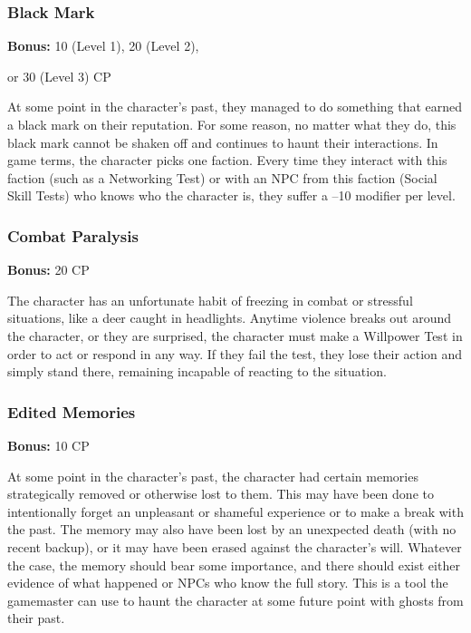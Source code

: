 \subsubsection{Black Mark}

\textbf{Bonus:} 10 (Level 1), 20 (Level 2), 

or 30 (Level 3) CP

At some point in the character's past, they managed 
to do something that earned a black mark on their 
reputation. For some reason, no matter what they do, 
this black mark cannot be shaken off and continues to 
haunt their interactions. In game terms, the character 
picks one faction. Every time they interact with this 
faction (such as a Networking Test) or with an NPC 
from this faction (Social Skill Tests) who knows who 
the character is, they suffer a –10 modifier per level.

\subsubsection{Combat Paralysis}

\textbf{Bonus:} 20 CP

The character has an unfortunate habit of freezing 
in combat or stressful situations, like a deer caught in 
headlights. Anytime violence breaks out around the 
character, or they are surprised, the character must 
make a Willpower Test in order to act or respond in 
any way. If they fail the test, they lose their action and 
simply stand there, remaining incapable of reacting to 
the situation.

\subsubsection{Edited Memories}

\textbf{Bonus:} 10 CP

At some point in the character's past, the character
had certain memories strategically removed or
otherwise lost to them. This may have been done to 
intentionally forget an unpleasant or shameful experience
or to make a break with the past. The memory
may also have been lost by an unexpected death (with 
no recent backup), or it may have been erased against 
the character's will. Whatever the case, the memory 
should bear some importance, and there should exist 
either evidence of what happened or NPCs who know 
the full story. This is a tool the gamemaster can use to 
haunt the character at some future point with ghosts 
from their past.

